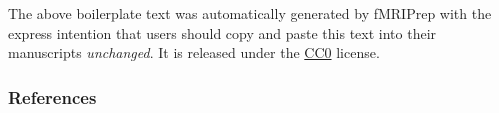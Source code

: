 \documentclass[]{article}
\begin{document}
The above boilerplate text was automatically generated by fMRIPrep with
the express intention that users should copy and paste this text into
their manuscripts \emph{unchanged}. It is released under the
\href{https://creativecommons.org/publicdomain/zero/1.0/}{CC0} license.

\hypertarget{references}{%
\subsubsection{References}\label{references}}


\end{document}
